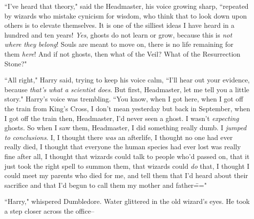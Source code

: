``I've heard that theory," said the Headmaster, his voice growing sharp, ``repeated by wizards who mistake cynicism for wisdom, who think that to look down upon others is to elevate themselves. It is one of the silliest ideas I have heard in a hundred and ten years! \emph{Yes}, ghosts do not learn or grow, because this is \emph{not where they belong}! Souls are meant to move on, there is no life remaining for them \emph{here}! And if not ghosts, then what of the Veil? What of the Resurrection Stone?"

``All right," Harry said, trying to keep his voice calm, ``I'll hear out your evidence, because \emph{that's what a scientist does}. But first, Headmaster, let me tell you a little story." Harry's voice was trembling. ``You know, when I got here, when I got off the train from King's Cross, I don't mean yesterday but back in September, when I got off the train then, Headmaster, I'd never seen a ghost. I wasn't \emph{expecting} ghosts. So when I saw them, Headmaster, I did something really dumb. I \emph{jumped to conclusions}. I, I thought there \emph{was} an afterlife, I thought no one had ever really died, I thought that everyone the human species had ever lost was really fine after all, I thought that wizards could talk to people who'd passed on, that it just took the right spell to summon them, that wizards could \emph{do} that, I thought I could meet my parents who died for me, and tell them that I'd heard about their sacrifice and that I'd begun to call them my mother and father\==="

``Harry," whispered Dumbledore. Water glittered in the old wizard's eyes. He took a step closer across the office\---

